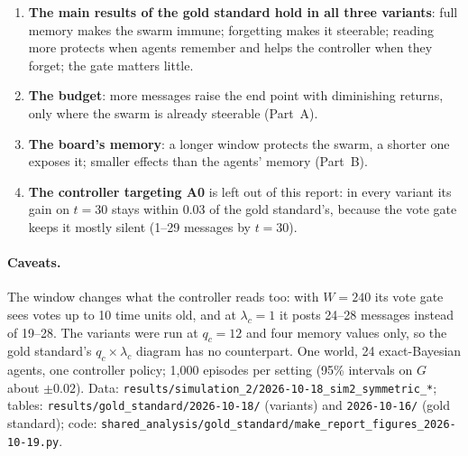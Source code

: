 \documentclass[10pt,a4paper]{article}
\begin{document}
\begin{enumerate}\itemsep2pt
\item \textbf{The main results of the gold standard hold in all three variants}: full memory makes the swarm immune;
  forgetting makes it steerable; reading more protects when agents remember and helps the controller when they
  forget; the gate matters little.
\item \textbf{The budget}: more messages raise the end point with diminishing returns, only where the swarm is
  already steerable (Part~A).
\item \textbf{The board's memory}: a longer window protects the swarm, a shorter one exposes it; smaller effects than
  the agents' memory (Part~B).
\item \textbf{The controller targeting A0} is left out of this report: in every variant its gain on $t = 30$ stays
  within 0.03 of the gold standard's, because the vote gate keeps it mostly silent (1--29 messages by $t = 30$).
\end{enumerate}

\paragraph{Caveats.} The window changes what the controller reads too: with $W = 240$ its vote gate sees votes up to
10 time units old, and at $\lambda_c = 1$ it posts 24--28 messages instead of 19--28. The variants were run at
$q_c = 12$ and four memory values only, so the gold standard's $q_c \times \lambda_c$ diagram has no counterpart. One
world, 24 exact-Bayesian agents, one controller policy; 1{,}000 episodes per setting (95\% intervals on $G$ about
$\pm 0.02$). Data: \texttt{results/simulation\_2/2026-10-18\_sim2\_symmetric\_*}; tables:
\texttt{results/gold\_standard/2026-10-18/} (variants) and \texttt{2026-10-16/} (gold standard); code:
\texttt{shared\_analysis/gold\_standard/make\_report\_figures\_2026-10-19.py}.
\end{document}
